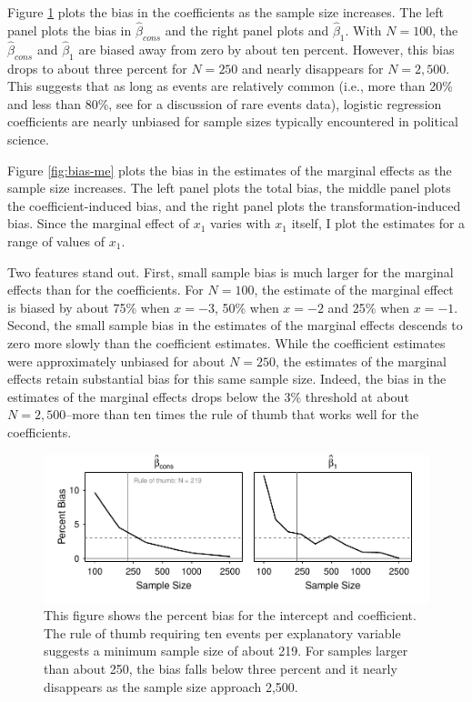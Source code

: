 \documentclass[12pt]{article}
\begin{document}
Figure \ref{fig:bias-coef} plots the bias in the coefficients as the sample size increases. The left panel plots the bias in $\hat{\beta}_{cons}$ and the right panel plots and $\hat{\beta}_1$. 
With $N = 100$, the $\hat{\beta}_{cons}$ and $\hat{\beta}_1$ are biased away from zero by about ten percent. 
However, this bias drops to about three percent for $N = 250$ and nearly disappears for $N = 2,500$.
This suggests that as long as events are relatively common (i.e., more than 20\% and less than 80\%, see \citealt{KingZeng2001} for a discussion of rare events data), logistic regression coefficients are nearly unbiased for sample sizes typically encountered in political science.

Figure \ref{fig:bias-me} plots the bias in the estimates of the marginal effects as the sample size increases. The left panel plots the total bias, the middle panel plots the coefficient-induced bias, and the right panel plots the transformation-induced bias.
Since the marginal effect of $x_1$ varies with $x_1$ itself, I plot the estimates for a range of values of $x_1$. 


Two features stand out. 
First, small sample bias is much larger for the marginal effects than for the coefficients. 
For $N = 100$, the estimate of the marginal effect is biased by about 75\% when $x = -3$, 50\% when $x = -2$ and 25\% when $x = -1$. 
Second, the small sample bias in the estimates of the marginal effects descends to zero more slowly than the coefficient estimates.
While the coefficient estimates were approximately unbiased for about $N = 250$, the estimates of the marginal effects retain substantial bias for this same sample size. 
Indeed, the bias in the estimates of the marginal effects drops below the 3\% threshold at about $N = 2,500$--more than ten times the rule of thumb that works well for the coefficients. 

\begin{figure}[h!]
\begin{center}
\includegraphics[scale = 0.7]{figs/bias-coef.pdf}
\caption{This figure shows the percent bias for the intercept and coefficient. 
The rule of thumb requiring ten events per explanatory variable suggests a minimum sample size of about 219. 
For samples larger than about 250, the bias falls below three percent and it nearly disappears as the sample size approach 2,500.}\label{fig:bias-coef}
\end{center}
\end{figure}
\end{document}
